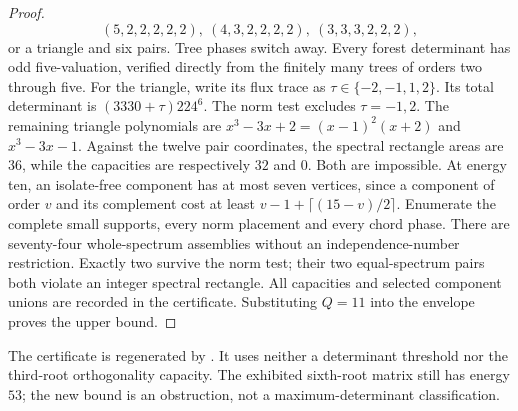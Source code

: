 \begin{proof}
\[(5,2,2,2,2,2),\ (4,3,2,2,2,2),\ (3,3,3,2,2,2),\]
or a triangle and six pairs. Tree phases switch away. Every forest determinant has odd five-valuation, verified directly from the finitely many trees of orders two through five. For the triangle, write its flux trace as $\tau\in\{-2,-1,1,2\}$. Its total determinant is $(3330+\tau)224^6$. The norm test excludes $\tau=-1,2$. The remaining triangle polynomials are $x^3-3x+2=(x-1)^2(x+2)$ and $x^3-3x-1$. Against the twelve pair coordinates, the spectral rectangle areas are $36$, while the capacities are respectively $32$ and $0$. Both are impossible. At energy ten, an isolate-free component has at most seven vertices, since a component of order $v$ and its complement cost at least $v-1+\lceil(15-v)/2\rceil$. Enumerate the complete small supports, every norm placement and every chord phase. There are seventy-four whole-spectrum assemblies without an independence-number restriction. Exactly two survive the norm test; their two equal-spectrum pairs both violate an integer spectral rectangle. All capacities and selected component unions are recorded in the certificate. Substituting $Q=11$ into the envelope proves the upper bound.
\end{proof}
The certificate is regenerated by . It uses neither a determinant threshold nor the third-root orthogonality capacity. The exhibited sixth-root matrix still has energy $53$; the new bound is an obstruction, not a maximum-determinant classification.
